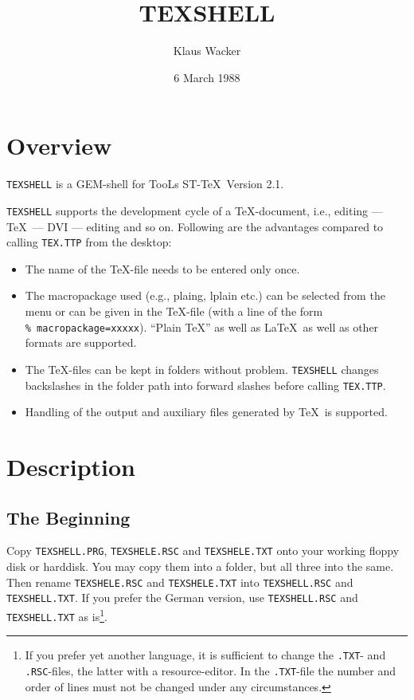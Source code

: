 \textheight 630pt 
\textwidth 15cm 
\oddsidemargin 0.5cm 
\evensidemargin 0.5cm 
\topmargin 0pt
\pagestyle{myheadings}
    
\title{TEXSHELL}
\author{Klaus Wacker}    
\date{6 March 1988}  
\maketitle
\section*{Overview}    
{\tt TEX\-SHELL} is
a GEM-shell for TooLs ST-\TeX\ Version 2.1.

{\tt TEX\-SHELL} supports the development cycle of a 
\TeX-document,
i.e., editing --- \TeX\ --- DVI --- editing and so on.
Following are the advantages compared to calling {\tt TEX.TTP} from the 
desktop:
\begin{itemize}

\item 
The name of the \TeX-file needs to be entered only once.

\item
The macropackage used (e.g., plaing, lplain etc.) can
be selected from the menu or can be given in the \TeX-file
(with a line of the form {\tt \%\ macropackage=xxxxx}).
``Plain \TeX '' as well as \LaTeX\ as well as other
formats are supported. 

\item
The \TeX-files can be kept in folders without problem.
{\tt TEX\-SHELL} changes backslashes in the folder path into forward 
slashes before calling {\tt TEX.TTP}.

\item
Handling of the output and auxiliary files generated by \TeX\
is supported.
\end{itemize}

\section*{Description}

\subsection*{The Beginning}

Copy {\tt TEX\-SHELL.\-PRG}, {\tt TEX\-SHELE.\-RSC} and
{\tt TEX\-SHELE.\-TXT} onto your working floppy disk or harddisk.
You may copy them into a folder, but all three into the same.
Then rename
{\tt TEX\-SHELE.\-RSC} and
{\tt TEX\-SHELE.\-TXT} into
{\tt TEX\-SHELL.\-RSC} and
{\tt TEX\-SHELL.\-TXT}.
If you prefer the German version, use
{\tt TEX\-SHELL.\-RSC} and
{\tt TEX\-SHELL.\-TXT} as is\footnote{
If you prefer yet another language, it is sufficient to change
the {\tt .TXT}-
and {\tt .RSC}-files, the latter with a resource-editor.
In the {\tt .TXT}-file the number and order of lines must not be changed
under any circumstances. 
}. 

